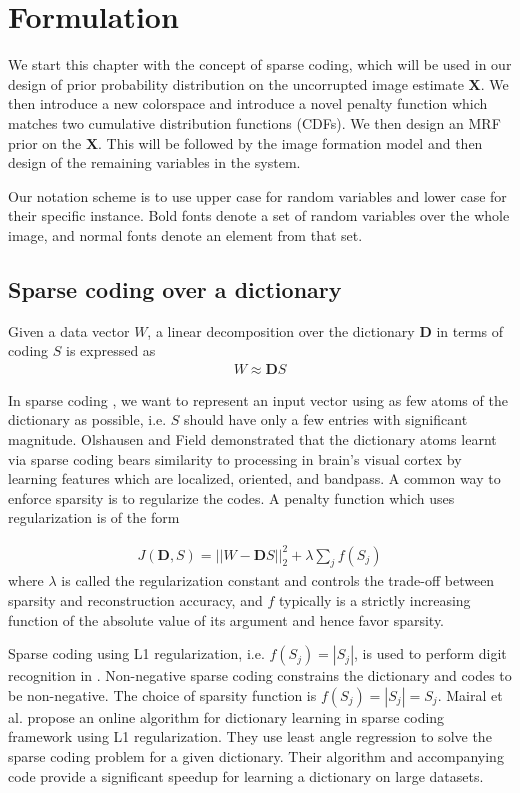 \chapter{Formulation}

We start this chapter with the concept of sparse coding, which will be used in our design of prior probability distribution on the uncorrupted image estimate $\mathbf{X}$. We then introduce a new colorspace and introduce a novel penalty function which matches two cumulative distribution functions (CDFs). We then design an MRF prior on the $\mathbf{X}$. This will be followed by the image formation model and then design of the remaining variables in the system.

Our notation scheme is to use upper case for random variables and lower case for their specific instance. Bold fonts denote a set of random variables over the whole image, and normal fonts denote an element from that set.

\section{Sparse coding over a dictionary}
Given a data vector $W$, a linear decomposition over the dictionary $\mathbf{D}$ in terms of coding $S$ is expressed as
\begin{align}
    W \approx \mathbf{D} S \label{eqn:lineardecomp}
\end{align}

In sparse coding \cite{harpur1996sc}, we want to represent an input vector using as few atoms of the dictionary as possible, i.e. $S$ should have only a few entries with significant magnitude. Olshausen and Field\cite{olshausen1996sparse} demonstrated that the dictionary atoms learnt via sparse coding bears similarity to processing in brain's visual cortex by learning features which are localized, oriented, and bandpass. A common way to enforce sparsity is to regularize the codes. A penalty function which uses regularization is of the form

\begin{align}
    J(\mathbf{D}, S) = || W - \mathbf{D} S ||_2^2 + \lambda \sum_{j} f(S_{j}) \label{eqn:sparsecoding}
\end{align}
where $\lambda$ is called the regularization constant and controls the trade-off between sparsity and reconstruction accuracy, and $f$ typically is a strictly increasing function of the absolute value of its argument and hence favor sparsity.

Sparse coding using L1 regularization, i.e. $f(S_{j}) = | S_{j} |$, is used to perform digit recognition in \cite{mairal2009supervised}. Non-negative sparse coding \cite{hoyer2002nnsc} constrains the dictionary and codes to be non-negative. The choice of sparsity function is $f(S_{j}) = | S_{j} | = S_{j}$. Mairal et al. \cite{mairal2009online} propose an online algorithm for dictionary learning in sparse coding framework using L1 regularization. They use least angle regression to solve the sparse coding problem for a given dictionary. Their algorithm and accompanying code provide a significant speedup for learning a  dictionary on large datasets.

